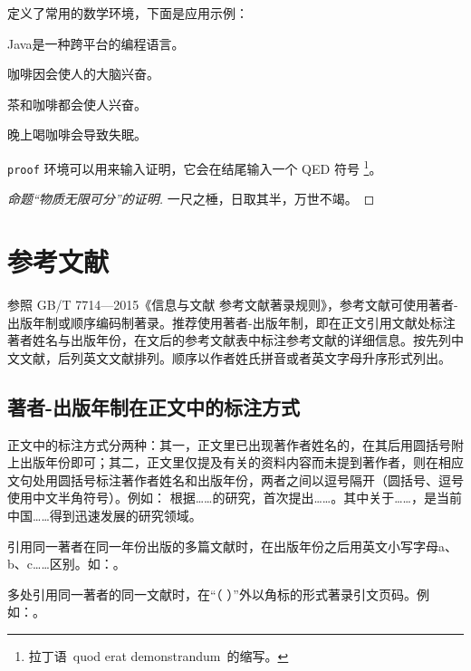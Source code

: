 \ucasthesis{} 定义了常用的数学环境，下面是应用示例：
\begin{definition}
Java是一种跨平台的编程语言。
\end{definition}

\begin{theorem}
咖啡因会使人的大脑兴奋。
\end{theorem}

\begin{lemma}
茶和咖啡都会使人兴奋。
\end{lemma}

\begin{corollary}
晚上喝咖啡会导致失眠。
\end{corollary}

\texttt{proof} 环境可以用来输入证明，它会在结尾输入一个 QED 符号
\footnote{拉丁语~quod erat demonstrandum~的缩写。}。

\begin{proof}[命题“物质无限可分”的证明]
一尺之棰，日取其半，万世不竭。
\end{proof}

\section{参考文献}
\label{sec:ref}

参照 GB/T 7714—2015《信息与文献 参考文献著录规则》，参考文献可使用著者-出版年制或顺序编码制著录。推荐使用著者-出版年制，即在正文引用文献处标注著者姓名与出版年份，在文后的参考文献表中标注参考文献的详细信息。按先列中文文献，后列英文文献排列。顺序以作者姓氏拼音或者英文字母升序形式列出。

\subsection{著者-出版年制在正文中的标注方式}

正文中的标注方式分两种：其一，正文里已出现著作者姓名的，在其后用圆括号附上出版年份即可；其二，正文里仅提及有关的资料内容而未提到著作者，则在相应文句处用圆括号标注著作者姓名和出版年份，两者之间以逗号隔开（圆括号、逗号使用中文半角符号）。例如：
\citet{nadkarni1992} 根据……的研究，首次提出……。其中关于……\citep{nadkarni1992}，是当前中国……得到迅速发展的研究领域\citep{zhu1973}。

引用同一著者在同一年份出版的多篇文献时，在出版年份之后用英文小写字母a、b、c……区别。如：\citep{chen2001a,chen2001b}。

多处引用同一著者的同一文献时，在“（ ）”外以角标的形式著录引文页码。例如：\citep[][343-351]{hua1973}。

